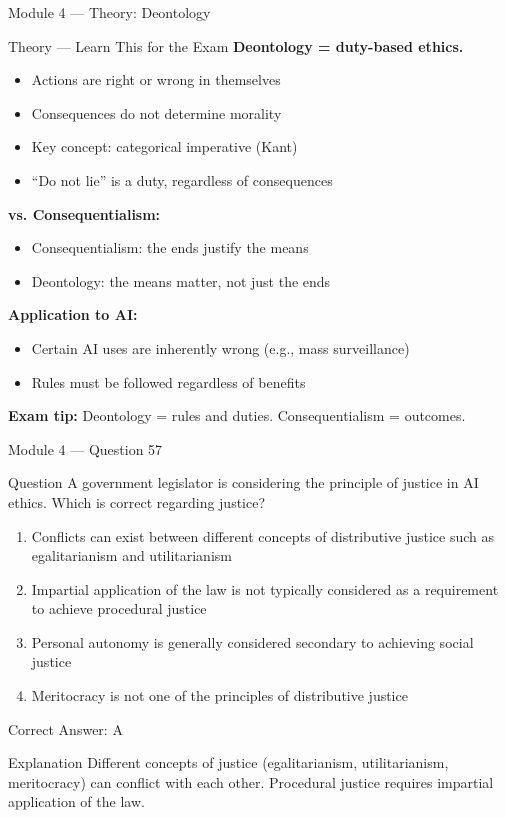 \documentclass[aspectratio=169,10pt]{beamer}
\newcommand{\question}[1]{%
	\begin{block}{Question}
		#1
	\end{block}
}
\newcommand{\options}[4]{%
	\begin{enumerate}[label=\Alph*.,leftmargin=*]
		\item #1
		\item #2
		\item #3
		\item #4
	\end{enumerate}
}
\newcommand{\answerbox}[1]{%
	\begin{exampleblock}{Correct Answer: #1}
	\end{exampleblock}
}
\newcommand{\explain}[1]{%
	\begin{block}{Explanation}
		\small #1
	\end{block}
}
\newcommand{\theory}[1]{%
	\begin{block}{Theory --- Learn This for the Exam}
		\small #1
	\end{block}
}
\begin{document}
	\begin{frame}{Module 4 --- Theory: Deontology}
		\theory{
			\textbf{Deontology = duty-based ethics.}
			\begin{itemize}
				\item Actions are right or wrong in themselves
				\item Consequences do not determine morality
				\item Key concept: categorical imperative (Kant)
				\item ``Do not lie'' is a duty, regardless of consequences
			\end{itemize}
			\textbf{vs. Consequentialism:}
			\begin{itemize}
				\item Consequentialism: the ends justify the means
				\item Deontology: the means matter, not just the ends
			\end{itemize}
			\textbf{Application to AI:}
			\begin{itemize}
				\item Certain AI uses are inherently wrong (e.g., mass surveillance)
				\item Rules must be followed regardless of benefits
			\end{itemize}
			\textbf{Exam tip:} Deontology = rules and duties. Consequentialism = outcomes.
		}
	\end{frame}
	
	\begin{frame}{Module 4 --- Question 57}
		\question{A government legislator is considering the principle of justice in AI ethics. Which is correct regarding justice?}
		\options{Conflicts can exist between different concepts of distributive justice such as egalitarianism and utilitarianism}{Impartial application of the law is not typically considered as a requirement to achieve procedural justice}{Personal autonomy is generally considered secondary to achieving social justice}{Meritocracy is not one of the principles of distributive justice}
		\answerbox{A}
		\explain{Different concepts of justice (egalitarianism, utilitarianism, meritocracy) can conflict with each other. Procedural justice requires impartial application of the law.}
	\end{frame}
	
\end{document}
